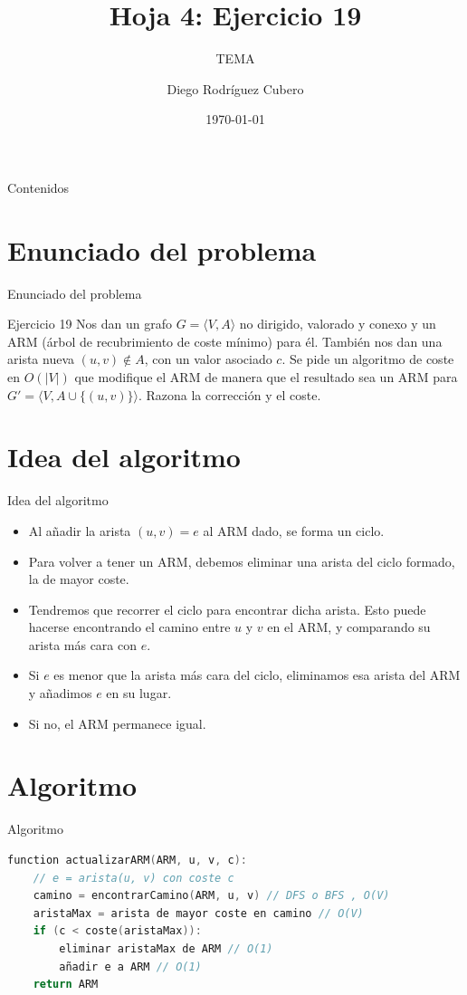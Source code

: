 \documentclass[aspectratio=169]{beamer}
\title{Hoja 4: Ejercicio 19}
\subtitle{TEMA}
\author{Diego Rodríguez Cubero}
\institute{UCM}
\date{\today}
\begin{document}
\begin{frame}
    \titlepage
\end{frame}

\begin{frame}{Contenidos}
    \tableofcontents
\end{frame}

\section{Enunciado del problema}
\begin{frame}{Enunciado del problema}
    \begin{block}{Ejercicio 19}
        Nos dan un grafo $G = ⟨V, A⟩$ no dirigido, valorado y conexo y un ARM (árbol de recubrimiento de coste mínimo) para él. También nos dan una arista nueva $(u, v) \notin A$, con un valor asociado $c$. Se pide un algoritmo de coste en $O(|V|)$ que modifique el ARM de manera que el resultado sea un ARM para $G' = ⟨V, A \cup \{(u, v)\}⟩$. Razona la corrección y el coste.
    \end{block}
\end{frame}

\section{Idea del algoritmo}
\begin{frame}{Idea del algoritmo}
    \begin{itemize}
        \item Al añadir la arista $(u, v) = e$ al ARM dado, se forma un ciclo.
        \item Para volver a tener un ARM, debemos eliminar una arista del ciclo formado, la de mayor coste.
        \item Tendremos que recorrer el ciclo para encontrar dicha arista. Esto puede hacerse encontrando el camino entre $u$ y $v$ en el ARM, y comparando su arista más cara con $e$.
        \item Si $e$ es menor que la arista más cara del ciclo, eliminamos esa arista del ARM y añadimos $e$ en su lugar.
        \item Si no, el ARM permanece igual.
    \end{itemize}
\end{frame}

\section{Algoritmo}
\begin{frame}[fragile]{Algoritmo}
    \begin{lstlisting}[language = C++, caption={Actualización del ARM al añadir una arista}]
    function actualizarARM(ARM, u, v, c):
    // e = arista(u, v) con coste c
    camino = encontrarCamino(ARM, u, v) // DFS o BFS , O(V)
    aristaMax = arista de mayor coste en camino // O(V)
    if (c < coste(aristaMax)):
        eliminar aristaMax de ARM // O(1)
        añadir e a ARM // O(1)
    return ARM
    \end{lstlisting}
\end{frame}
\end{document}
